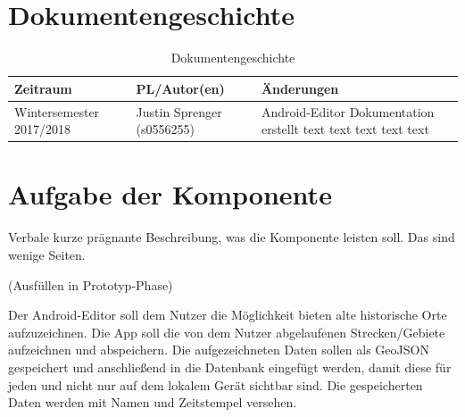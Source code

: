 \usepackage{url}
\usepackage{graphicx}
\section{Dokumentengeschichte}
\begin{table}[h]
 \begin{tabular}{|l|l|p{4cm}|}
 \hline
 Zeitraum & PL/Autor(en) & Änderungen \\
 \hline
 Wintersemester 2017/2018 & Justin Sprenger (s0556255) & 
Android-Editor Dokumentation erstellt \newline 
text \newline 
text \newline 
text \newline 
text \newline 
text \newline 
 
  \\
 \hline
 \end{tabular}
 \caption{Dokumentengeschichte}
 \end{table}

\section{Aufgabe der Komponente}
Verbale kurze prägnante Beschreibung, was die Komponente leisten soll.
Das sind wenige Seiten.

(Ausfüllen in Prototyp-Phase) 


Der Android-Editor soll dem Nutzer die Möglichkeit bieten alte historische Orte aufzuzeichnen. Die App soll die von dem Nutzer abgelaufenen Strecken/Gebiete aufzeichnen und abspeichern. Die aufgezeichneten Daten sollen als GeoJSON gespeichert und anschließend in die Datenbank eingefügt werden, damit diese für jeden und nicht nur auf dem lokalem Gerät sichtbar sind. Die gespeicherten Daten werden mit Namen und Zeitstempel versehen.

